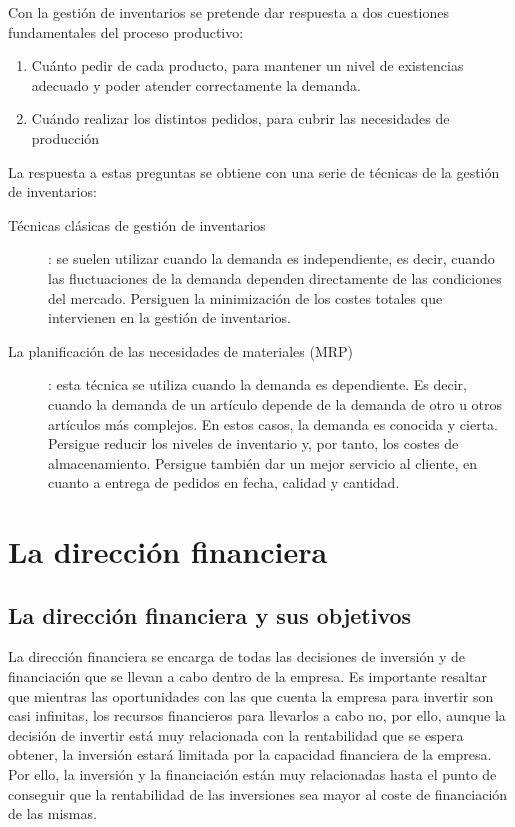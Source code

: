 \documentclass[10pt,a4paper,spanish]{report}
\begin{document}
                  Con la gestión de inventarios se pretende dar respuesta a dos cuestiones fundamentales del proceso productivo:
                  \begin{enumerate}
                        \item Cuánto pedir de cada producto, para mantener un nivel de existencias adecuado y poder atender correctamente la demanda.

                        \item Cuándo realizar los distintos pedidos, para cubrir las necesidades de producción
                  \end{enumerate}

                  La respuesta a estas preguntas se obtiene con una serie de técnicas de la gestión de inventarios:

                  \begin{description}
                        \item[Técnicas clásicas de gestión de inventarios]: se suelen utilizar cuando la demanda es independiente, es decir, cuando las fluctuaciones de la demanda dependen directamente de las condiciones del mercado. Persiguen la minimización de los costes totales que intervienen en la gestión de inventarios.

                        \item[La planificación de las necesidades de materiales (MRP)]: esta técnica se utiliza cuando la demanda es dependiente. Es decir, cuando la demanda de un artículo depende de la demanda de otro u otros artículos más complejos. En estos casos, la demanda es conocida y cierta. Persigue reducir los niveles de inventario y, por tanto, los costes de almacenamiento. Persigue también dar un mejor servicio al cliente, en cuanto a entrega de pedidos en fecha, calidad y cantidad.
                  \end{description}

\chapter{\textcolor[rgb]{0.4,0.7,0.4}La dirección financiera}
      
    \section{\textcolor[rgb]{0.4,0.7,0.4}La dirección financiera y sus objetivos}

        La dirección financiera se encarga de todas las decisiones de inversión y de financiación que se llevan a cabo dentro de la empresa. Es importante resaltar que mientras las oportunidades con las que cuenta la empresa para invertir son casi infinitas, los recursos financieros para llevarlos a cabo no, por ello, aunque la decisión de invertir está muy relacionada con la rentabilidad que se espera obtener, la inversión estará limitada por la capacidad financiera de la empresa. Por ello, la inversión y la financiación están muy relacionadas hasta el punto de conseguir que la rentabilidad de las inversiones sea mayor al coste de financiación de las mismas.
\end{document}

